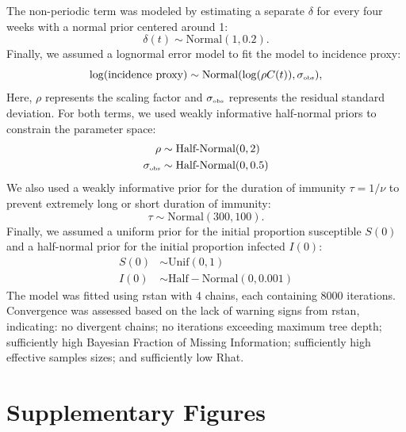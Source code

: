 \documentclass[12pt]{article}
\newcommand{\tsub}[2]{#1_{{\textrm{\tiny #2}}}}
\begin{document}
The non-periodic term was modeled by estimating a separate $\delta$ for every four weeks with a normal prior centered around 1:
\begin{equation}
\delta(t) \sim \mathrm{Normal}(1, 0.2).
\end{equation}
Finally, we assumed a lognormal error model to fit the model to incidence proxy:
\begin{equation}
\log (\textrm{incidence proxy}) \sim \mathrm{Normal}(\log (\rho C(t)), \tsub{\sigma}{obs}),
\end{equation}
Here, $\rho$ represents the scaling factor and $\tsub{\sigma}{obs}$ represents the residual standard deviation.
For both terms, we used weakly informative half-normal priors to constrain the parameter space:
\begin{align}
\rho &\sim \textrm{Half-Normal}(0, 2)\\
\tsub{\sigma}{obs} &\sim \textrm{Half-Normal}(0, 0.5)
\end{align}
We also used a weakly informative prior for the duration of immunity $\tau = 1/\nu$ to prevent extremely long or short duration of immunity:
\begin{equation}
\tau \sim \mathrm{Normal}(300, 100).
\end{equation}
Finally, we assumed a uniform prior for the initial proportion susceptible $S(0)$ and a half-normal prior for the initial proportion infected $I(0)$:
\begin{align}
S(0) &\sim \mathrm{Unif}(0, 1)\\
I(0) &\sim \mathrm{Half-Normal}(0, 0.001)
\end{align}
The model was fitted using rstan \citep{carpenter2017stan,rstan} with 4 chains, each containing 8000 iterations.
Convergence was assessed based on the lack of warning signs from rstan, indicating: no divergent chains; no iterations exceeding maximum tree depth; sufficiently high Bayesian Fraction of Missing Information; sufficiently high effective samples sizes; and sufficiently low Rhat.

\pagebreak

\section*{Supplementary Figures}
\end{document}
